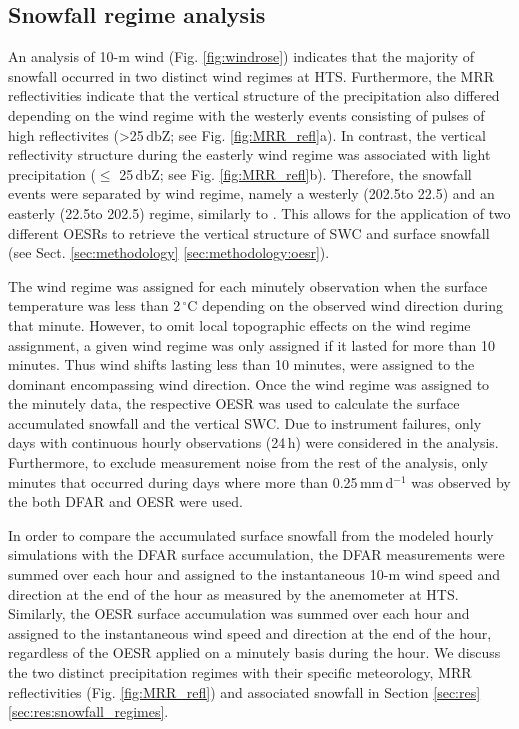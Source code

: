 \documentclass{ametsocV5}
\begin{document}
    \subsection{Snowfall regime analysis}\label{sec:methodology:snowfall_reg}
        An analysis of 10-m wind (Fig. \ref{fig:windrose}) indicates that the majority of snowfall occurred in two distinct wind regimes at HTS. Furthermore, the MRR reflectivities indicate that the vertical structure of the precipitation also differed depending on the wind regime with the westerly events consisting of pulses of high reflectivites (\textgreater 25\,dbZ; see Fig. \ref{fig:MRR_refl}a). In contrast, the vertical reflectivity structure during the easterly wind regime was associated with light precipitation ($\leq$ 25\,dbZ; see Fig. \ref{fig:MRR_refl}b). Therefore, the snowfall events were separated by wind regime, namely a westerly (202.5\textdegree to 22.5\textdegree) and an easterly (22.5\textdegree to 202.5\textdegree) regime, similarly to \citet{schirle_estimation_2019}. This allows for the application of two different OESRs to retrieve the vertical structure of SWC and surface snowfall (see Sect. \ref{sec:methodology} \ref{sec:methodology:oesr}).
        
        The wind regime was assigned for each minutely observation when the surface temperature was less than 2\,$^{\circ}$C depending on the observed wind direction during that minute. However, to omit local topographic effects on the wind regime assignment, a given wind regime was only assigned if it lasted for more than 10 minutes. Thus wind shifts lasting less than 10 minutes, were assigned to the dominant encompassing wind direction. Once the wind regime was assigned to the minutely data, the respective OESR was used to calculate the surface accumulated snowfall and the vertical SWC. Due to instrument failures, only days with continuous hourly observations (24\,h) were considered in the analysis. Furthermore, to exclude measurement noise from the rest of the analysis, only minutes that occurred during days where more than 0.25\,mm\,d$^{-1}$ was observed by the both DFAR and OESR were used. 
        
        In order to compare the accumulated surface snowfall from the modeled hourly simulations with the DFAR surface accumulation, the DFAR measurements were summed over each hour and assigned to the instantaneous 10-m wind speed and direction at the end of the hour as measured by the anemometer at HTS. Similarly, the OESR surface accumulation was summed over each hour and assigned to the instantaneous wind speed and direction at the end of the hour, regardless of the OESR applied on a minutely basis during the hour. 
        We discuss the two distinct precipitation regimes with their specific meteorology, MRR reflectivities (Fig. \ref{fig:MRR_refl}) and associated snowfall in Section \ref{sec:res} \ref{sec:res:snowfall_regimes}.
\end{document}
